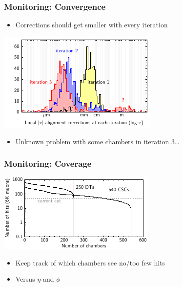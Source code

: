 \documentclass[compress]{beamer}
\begin{document}
\begin{frame}
  \frametitle{Monitoring: Convergence}
  \begin{itemize}
    \item Corrections should get smaller with every iteration
  \end{itemize}

  \vspace{-0.5 cm}
  \begin{center}
    \includegraphics[width=0.85\linewidth]{three_iterations_really}
  \end{center}

  \vspace{-0.5 cm}
  \begin{itemize}
    \item Unknown problem with some chambers in iteration 3\ldots
  \end{itemize}
\end{frame}

\begin{frame}
  \frametitle{Monitoring: Coverage}
  \includegraphics[width=\linewidth]{coverage}

  \begin{itemize}
    \item Keep track of which chambers see no/too few hits
    \item Versus $\eta$ and $\phi$
  \end{itemize}
\end{frame}
\end{document}
